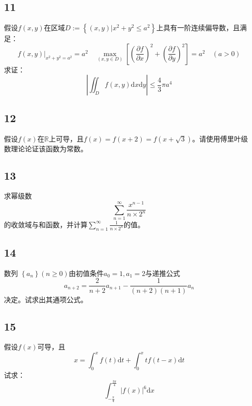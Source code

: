 \documentclass[a4paper,12pt]{article}
\begin{document}
\subsection*{11}\noindent
假设$f(x,y)$在区域$D:=\left\{(x,y)|x^2+y^2\leq a^2\right\}$上具有一阶连续偏导数，且满足：
\begin{equation*}
	f(x,y)|_{x^2+y^2=a^2}=a^2\quad \max\limits_{(x,y\in D)}\left[\left(\frac{\partial f}{\partial x}\right)^2+\left(\frac{\partial f}{\partial y}\right)^2\right]=a^2\quad(a>0)
\end{equation*}
求证：
\begin{equation*}
	\left|\iint_{D}f(x,y)\mathrm{d}x\mathrm{d}y\right|\leq\frac{4}{3}\pi a^4
\end{equation*}
\subsection*{12}\noindent
假设$f(x)$在$\mathbb{R}$上可导，且$f(x)=f(x+2)=f(x+\sqrt{3})$。请使用傅里叶级数理论论证该函数为常数。

\subsection*{13}
\noindent 求幂级数
\begin{equation*}
	\sum_{n=1}^{\infty}\frac{x^{n-1}}{n\times 2^n}
\end{equation*}
的收敛域与和函数，并计算$\sum_{n=1}^{\infty}\frac{1}{n\times2^n}$的值。

\subsection*{14}
\noindent 数列
$\left\{a_{n}\right\}(n\geq 0)$由初值条件$a_{0}=1,a_{1}=2$与递推公式\begin{equation*}
	a_{n+2}=\frac{2}{n+2}a_{n+1}-\frac{1}{(n+2)(n+1)}a_{n}
\end{equation*}
决定。试求出其通项公式。

\subsection*{15}
\noindent 假设$f\left(x\right)$可导，且\begin{equation*}
	x=\int_{0}^{x}f\left(t\right)\mathrm{d}t+\int_{0}^{x}tf\left(t-x\right)\mathrm{d}t
\end{equation*}
试求：
\begin{equation*}
	\int_{-\frac{\pi}{4}}^{\frac{3\pi}{4}}\left|f\left(x\right)\right|^6\mathrm{d}x
\end{equation*}
\end{document}
